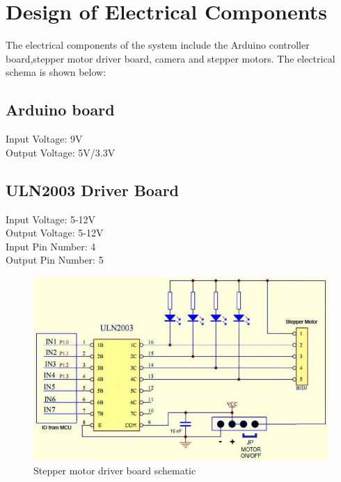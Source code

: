 \documentclass[12pt, titlepage]{article}
\begin{document}
\section{Design of Electrical Components}


The electrical components of the system include the Arduino controller board,stepper motor driver board, camera and stepper motors. The electrical schema is shown below:\\
\subsection{Arduino board}
Input Voltage: 9V\\
Output Voltage: 5V/3.3V

\subsection{ULN2003 Driver Board}
	Input Voltage: 5-12V\\
	Output Voltage: 5-12V\\
	Input Pin Number: 4\\
	Output Pin Number: 5 \\

	\begin{figure}[H]
	\centering
	\includegraphics[width=\textwidth]{ULN2003}
	\caption{Stepper motor driver board schematic}
	\end{figure}
\end{document}
